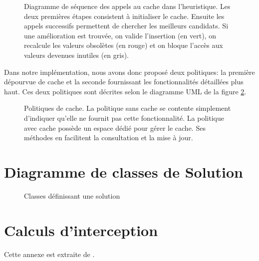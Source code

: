 	\begin{figure}[H]
		\centering
		\begin{tikzpicture}
			
		\end{tikzpicture}
		\caption[Diagramme de séquence des appels au cache dans l'heuristique]{Diagramme de séquence des appels au cache dans l'heuristique. {\scriptsize Les deux premières étapes consistent à initialiser le cache. Ensuite les appels successifs permettent de chercher les meilleurs candidats. Si une amélioration est trouvée, on valide l'insertion (en vert), on recalcule les valeurs obsolètes (en rouge) et on bloque l'accès aux valeurs devenues inutiles (en gris).}}
		\label{diag:cache}
	\end{figure}

	Dans notre implémentation, nous avons donc proposé deux politiques: la première dépourvue de cache et la seconde fournissant les fonctionnalités détaillées plus haut. Ces deux politiques sont décrites selon le diagramme UML de la figure \ref{uml:cache_policies}.

	\begin{figure}[h]
		\centering
		\begin{tikzpicture}
						
		\end{tikzpicture}
		\caption[UML -- Politiques de cache]{Politiques de cache. {\scriptsize La politique sans cache se contente simplement d'indiquer qu'elle ne fournit pas cette fonctionnalité. La politique avec cache possède un espace dédié pour gérer le cache. Ses méthodes en facilitent la consultation et la mise à jour.}}
		\label{uml:cache_policies}
	\end{figure}

\chapter{Diagramme de classes de Solution}

	\vspace*{-1cm}
	\begin{figure}[h!]
		\centering
		\begin{tikzpicture}
			
		\end{tikzpicture}
		\caption{Classes définissant une solution}
		\label{fig:solution-uml}
	\end{figure}
	
\chapter{Calculs d'interception}
\label{ann:calculs}
	Cette annexe est extraite de \cite{projet-zz1}.

